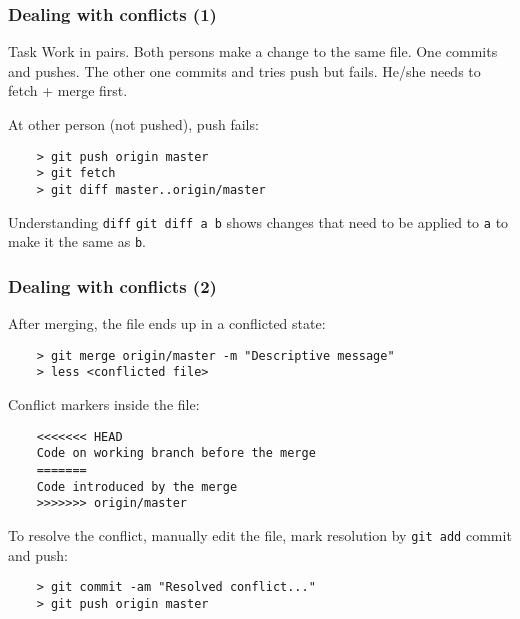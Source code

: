 
\begin{frame}[fragile]
	\frametitle{Dealing with conflicts (1)}
	
	\begin{block}{Task}
	Work in pairs. Both persons make a change to the same file. One commits and pushes. The other one commits and tries push but fails. He/she needs to fetch + merge first.	
	\end{block}
	
	At other person (not pushed), push fails:
	\begin{verbatim}
	> git push origin master
	> git fetch
	> git diff master..origin/master
	\end{verbatim}
	
	\begin{block}{Understanding \texttt{diff}}
	\texttt{git diff a b} shows changes that need to be applied to \texttt{a} to make it the same as \texttt{b}.
	\end{block}
\end{frame}

\begin{frame}[fragile]
	\frametitle{Dealing with conflicts (2)}
	
	After merging, the file ends up in a conflicted state:
	\begin{verbatim}
	> git merge origin/master -m "Descriptive message"
	> less <conflicted file>	
	\end{verbatim}	
	
	Conflict markers inside the file:
	\begin{verbatim}
	<<<<<<< HEAD
	Code on working branch before the merge
	=======
	Code introduced by the merge
	>>>>>>> origin/master
	\end{verbatim}

	To resolve the conflict, manually edit the file, mark resolution by \texttt{git add} commit and push:
	\begin{verbatim}
	> git commit -am "Resolved conflict..."
	> git push origin master
	\end{verbatim}
	
\end{frame}




